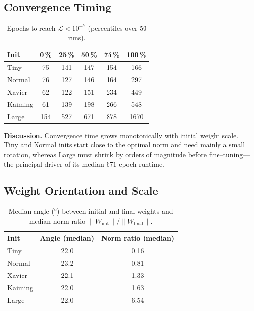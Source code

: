 \subsection*{Convergence Timing}

\begin{table}[h]
\centering
\caption{Epochs to reach $\mathcal L<10^{-7}$ (percentiles over 50 runs).}
\label{tab:abs1-init-epochs}
\begin{tabular}{lccccc}
\toprule
Init & 0\,\% & 25\,\% & 50\,\% & 75\,\% & 100\,\% \\
\midrule
Tiny    & 75  & 141 & 147 & 154 & 166 \\
Normal  & 76  & 127 & 146 & 164 & 297 \\
Xavier  & 62  & 122 & 151 & 234 & 449 \\
Kaiming & 61  & 139 & 198 & 266 & 548 \\
Large   & 154 & 527 & 671 & 878 & 1670 \\
\bottomrule
\end{tabular}
\end{table}

\textbf{Discussion.}  
Convergence time grows monotonically with initial weight scale.  Tiny and
Normal inits start close to the optimal norm and need mainly a small rotation,
whereas Large must shrink by orders of magnitude before fine–tuning—the
principal driver of its median $671$-epoch runtime.

\subsection*{Weight Orientation and Scale}

\begin{table}[h]
\centering
\caption{Median angle (°) between initial and final weights and median
norm ratio $\lVert W_{\text{init}}\rVert / \lVert W_{\text{final}}\rVert$.}
\label{tab:abs1-init-angle-norm}
\begin{tabular}{lcc}
\toprule
Init & Angle (median) & Norm ratio (median) \\
\midrule
Tiny    & 22.0 & 0.16 \\
Normal  & 23.2 & 0.81 \\
Xavier  & 22.1 & 1.33 \\
Kaiming & 22.0 & 1.63 \\
Large   & 22.0 & 6.54 \\
\bottomrule
\end{tabular}
\end{table}

